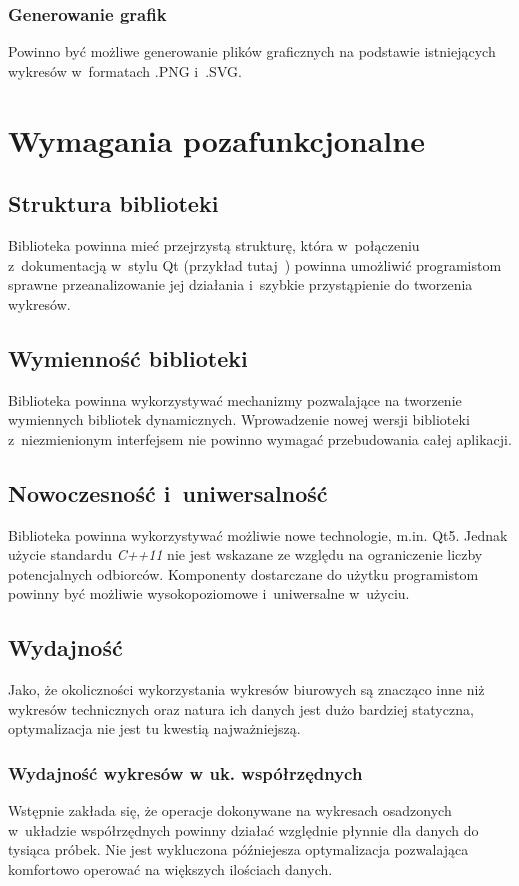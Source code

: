 \documentclass[11pt,twoside,a4paper,final]{article}
\begin{document}
\subsubsection{Generowanie grafik}
Powinno być możliwe generowanie plików graficznych na podstawie istniejących wykresów w~formatach .PNG i~.SVG.



\section{Wymagania pozafunkcjonalne}


\subsection{Struktura biblioteki}
Biblioteka powinna mieć przejrzystą strukturę, która w~połączeniu z~dokumentacją w~stylu Qt (przykład tutaj~\cite{qt-doc}) powinna umożliwić programistom sprawne przeanalizowanie jej działania i~szybkie przystąpienie do tworzenia wykresów.

\subsection{Wymienność biblioteki}
Biblioteka powinna wykorzystywać mechanizmy pozwalające na tworzenie wymiennych bibliotek dynamicznych. Wprowadzenie nowej wersji biblioteki z~niezmienionym interfejsem nie powinno wymagać przebudowania całej aplikacji.

\subsection{Nowoczesność i~uniwersalność}
Biblioteka powinna wykorzystywać możliwie nowe technologie, m.in. Qt5. Jednak użycie standardu \textit{C++11} nie jest wskazane ze względu na ograniczenie liczby potencjalnych odbiorców. Komponenty dostarczane do użytku programistom powinny być możliwie wysokopoziomowe i~uniwersalne w~użyciu.

\subsection{Wydajność}
Jako, że okoliczności wykorzystania wykresów biurowych są znacząco inne niż wykresów technicznych oraz natura ich danych jest dużo bardziej statyczna, optymalizacja nie jest tu kwestią najważniejszą. 

\subsubsection{Wydajność wykresów w uk. współrzędnych}
Wstępnie zakłada się, że operacje dokonywane na wykresach osadzonych w~układzie współrzędnych powinny działać względnie płynnie dla danych do tysiąca próbek. Nie jest wykluczona późniejesza optymalizacja
pozwalająca komfortowo operować na większych ilościach danych.
\end{document}
